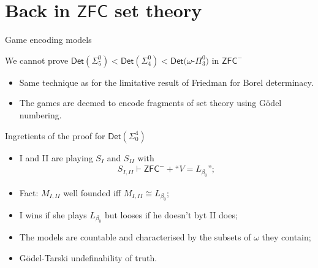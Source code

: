 \documentclass{beamer} %
\begin{document}

\section{Back in \texorpdfstring{$\mathsf{ZFC}$}{ZFC} set theory}

\begin{frame}{Game encoding models}
    \begin{theorem}
        We cannot prove $\mathsf{Det}(\Sigma_5^0)<\mathsf{Det}(\Sigma_4^0)
        <\mathsf{Det}(\omega$-$\Pi_3^0)$ in $\mathsf{ZFC^-}$ 
    \end{theorem}

    \begin{itemize}
        \item<2-> Same technique as for the limitative result of Friedman for 
            Borel determinacy.
        \item<3-> The games are deemed to encode fragments of set theory using Gödel numbering.
    \end{itemize}
\end{frame}


\begin{frame}{Ingretients of the proof for $\mathsf{Det}(\Sigma_0^4)$}
    \begin{itemize}
        \item<1-> I and II are playing $S_I$ and $S_{II}$ with \begin{align*}
            S_{I,II} \vdash \mathsf{ZFC}^- + \text{``$V=L_{\beta_0}$''};
        \end{align*}
        \item<2-> Fact: $M_{I,II}$ well founded iff $M_{I,II} \cong L_{\beta_0}$;
        \item<3-> I wins if she plays $L_{\beta_0}$ but looses if he doesn't byt II does;
        \item<4-> The models are countable and characterised by the subsets of $\omega$ they 
        contain;
        \item<5-> Gödel-Tarski undefinability of truth.
    \end{itemize}
\end{frame}

\end{document}
